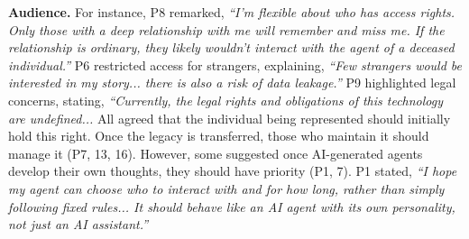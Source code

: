 \textbf{Audience.} \label{audience}
 For instance, P8 remarked, \textit{``I'm flexible about who has access rights. Only those with a deep relationship with me will remember and miss me. If the relationship is ordinary, they likely wouldn't interact with the agent of a deceased individual.''}
 P6 restricted access for strangers, explaining, \textit{``Few strangers would be interested in my story... there is also a risk of data leakage.''} P9 highlighted legal concerns, stating, \textit{``Currently, the legal rights and obligations of this technology are undefined... }
 All agreed that the individual being represented should initially hold this right. Once the legacy is transferred, those who maintain it should manage it (P7, 13, 16). However, some suggested once AI-generated agents develop their own thoughts, they should have priority (P1, 7). P1 stated, \textit{``I hope my agent can choose who to interact with and for how long, rather than simply following fixed rules... It should behave like an AI agent with its own personality, not just an AI assistant.''}

